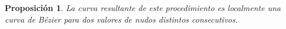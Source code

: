 \documentclass[11pt]{book}
\theoremstyle{plain} %
\newtheorem{proposicion}[teorema]{Proposición}
\theoremstyle{definition} %
\theoremstyle{definition} %
\begin{document}
\begin{proposicion}\label{prop:eq_bezier_loc}
    La curva resultante de este procedimiento es localmente una curva de Bézier para dos valores de nudos distintos consecutivos.

\end{proposicion}
\end{document}
